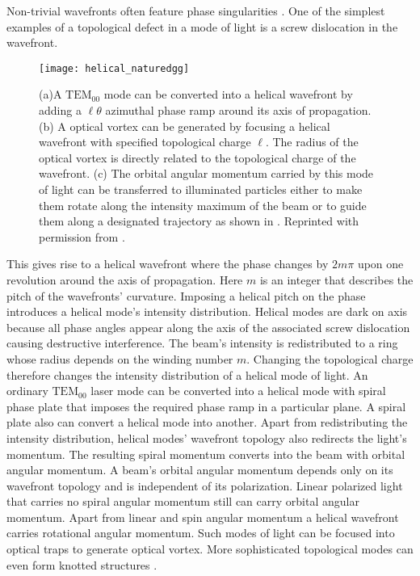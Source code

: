 Non-trivial wavefronts often feature phase singularities \cite{Bazhenov1992}.  One of the simplest examples of a topological defect in a mode of light is a screw dislocation \cite{Bazhenov1992} in the wavefront.
\begin{figure}[t!]
  \centering
  \texttt{[image: helical\_naturedgg]}
  \caption{(a)A $\mathrm{TEM}_{00}$ mode can be converted into a helical wavefront by adding a $\ell \theta$ azimuthal phase ramp around its axis of propagation. (b) A optical vortex can be generated by focusing a helical wavefront with specified topological charge $\ell$. The radius of the optical vortex is directly related to the topological charge of the wavefront. (c) The orbital angular momentum carried by this mode of light can be transferred to illuminated particles either to make them rotate along the intensity maximum of the beam or to guide them along a designated trajectory as shown in  \cite{Curtis:03}. Reprinted with permission from \cite{grier2003nature}.}
  \label{fig:helical}
\end{figure}
This gives rise to a helical wavefront where the phase changes by $2m\pi$ upon one revolution around the axis of propagation. Here $m$ is an integer that describes the pitch of the wavefronts' curvature. Imposing a helical pitch on the phase introduces a helical mode's intensity distribution. Helical modes are dark \cite{Bazhenov1992,nye1997} on axis because all phase angles appear along the axis of the associated screw dislocation causing destructive interference. The beam's intensity is redistributed to a ring whose radius depends on the winding number $m$. Changing the topological charge therefore changes the intensity distribution of a helical mode of light. An ordinary $\mathrm{TEM_{00}}$ laser mode can be converted into a helical mode with spiral phase plate that imposes the required phase ramp in a particular plane. A spiral plate \cite{BEIJERSBERGEN1994321} also can convert a helical mode into another. Apart from redistributing the intensity distribution, helical modes' wavefront topology also redirects the light's momentum. The resulting spiral momentum converts into the beam with orbital angular momentum. A beam's orbital angular momentum depends only on its wavefront topology and is independent of its polarization. Linear polarized light that carries no spiral angular momentum still can carry orbital angular momentum. Apart from linear and spin angular momentum a helical wavefront carries rotational angular momentum. Such modes of light can be focused into optical traps to generate optical vortex. More sophisticated topological modes can even form knotted structures \cite{leach2004}. 


